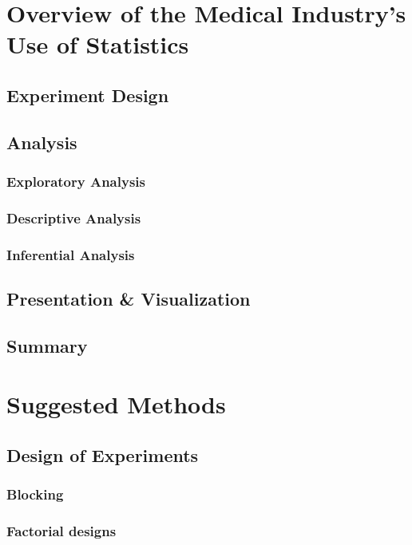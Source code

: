 \documentclass[11pt,a4paper,article]{memoir} %
\begin{document}


\newpage
\chapter{Overview of the Medical Industry's Use of Statistics}\label{industry_context} %

\section{Experiment Design}

\section{Analysis}
\subsection{Exploratory Analysis}
\subsection{Descriptive Analysis}
\subsection{Inferential Analysis}

\section{Presentation \& Visualization}

\section{Summary}

\newpage


\chapter{Suggested Methods}
\section{Design of Experiments}
\subsection{Blocking}
\subsection{Factorial designs}
\end{document}
